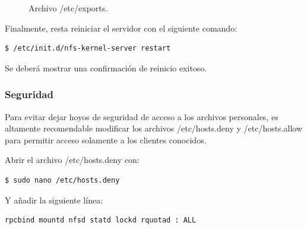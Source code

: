 \begin{figure}[H] %
\caption{Archivo /etc/exports.}
\label{fig:NFSKer3}
\end{figure}

Finalmente, resta reiniciar el servidor con el siguiente comando: 

\begin{lstlisting}[language=bash]
$ /etc/init.d/nfs-kernel-server restart
\end{lstlisting}

Se deberá mostrar una confirmación de reinicio exitoso.

\subsubsection{Seguridad}\label{subsec:conf}

Para evitar dejar hoyos de seguridad de acceso a los archivos personales, es altamente recomendable modificar los archivos /etc/hosts.deny y /etc/hosts.allow para permitir acceso solamente a los clientes conocidos.

Abrir el archivo /etc/hosts.deny con:

\begin{lstlisting}[language=bash]
$ sudo nano /etc/hosts.deny
\end{lstlisting}

Y añadir la siguiente línea:

\begin{lstlisting}[language=bash]
rpcbind mountd nfsd statd lockd rquotad : ALL
\end{lstlisting}

